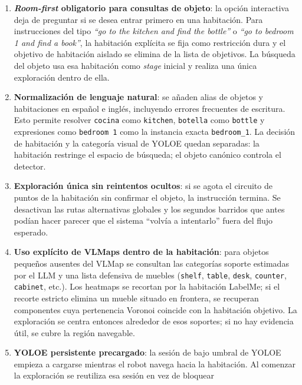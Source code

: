 \documentclass[11pt,a4paper]{article}
\begin{document}
\begin{enumerate}
  \item \textbf{\textit{Room-first} obligatorio para consultas de objeto}: la
        opción interactiva deja de preguntar si se desea entrar primero en una
        habitación. Para instrucciones del tipo
        \textit{``go to the kitchen and find the bottle''} o
        \textit{``go to bedroom 1 and find a book''}, la habitación explícita
        se fija como restricción dura y el objetivo de habitación aislado se
        elimina de la lista de objetivos. La búsqueda del objeto usa esa
        habitación como \emph{stage} inicial y realiza una única exploración
        dentro de ella.
  \item \textbf{Normalización de lenguaje natural}: se añaden alias de objetos
        y habitaciones en español e inglés, incluyendo errores frecuentes de
        escritura. Esto permite resolver \texttt{cocina} como
        \texttt{kitchen}, \texttt{botella} como \texttt{bottle} y expresiones
        como \texttt{bedroom 1} como la instancia exacta
        \texttt{bedroom\_1}. La decisión de habitación y la categoría visual de
        YOLOE quedan separadas: la habitación restringe el espacio de búsqueda;
        el objeto canónico controla el detector.
  \item \textbf{Exploración única sin reintentos ocultos}: si se agota el
        circuito de puntos de la habitación sin confirmar el objeto, la
        instrucción termina. Se desactivan las rutas alternativas globales y
        los segundos barridos que antes podían hacer parecer que el sistema
        ``volvía a intentarlo'' fuera del flujo esperado.
  \item \textbf{Uso explícito de VLMaps dentro de la habitación}: para objetos
        pequeños ausentes del VLMap se consultan las categorías soporte
        estimadas por el LLM y una lista defensiva de muebles
        (\texttt{shelf}, \texttt{table}, \texttt{desk}, \texttt{counter},
        \texttt{cabinet}, etc.). Los heatmaps se recortan por la habitación
        LabelMe; si el recorte estricto elimina un mueble situado en frontera,
        se recuperan componentes cuya pertenencia Voronoi coincide con la
        habitación objetivo. La exploración se centra entonces alrededor de
        esos soportes; si no hay evidencia útil, se cubre la región navegable.
  \item \textbf{YOLOE persistente precargado}: la sesión de bajo umbral de
        YOLOE empieza a cargarse mientras el robot navega hacia la habitación.
        Al comenzar la exploración se reutiliza esa sesión en vez de bloquear

\end{enumerate}
\end{document}

